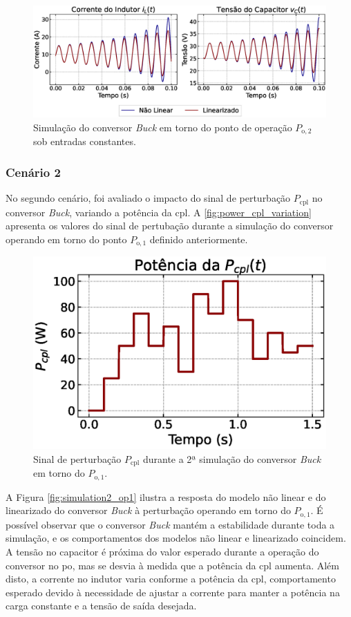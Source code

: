 \begin{figure}[H]
  \centering
  \captionsetup{justification=centering}
  \includegraphics[width=1.\textwidth]{figuras/buck/sim1/op2/result.eps}
  \caption{Simulação do conversor \textit{Buck} em torno do ponto de operação $P_{\mathrm{o}, 2}$ sob entradas constantes.}
  \label{fig:simulation_1_buck_2}
\end{figure}

\subsubsection{Cenário 2}

No segundo cenário, foi avaliado o impacto do sinal de perturbação $P_{\mathrm{cpl}}$ no conversor \textit{Buck}, variando a potência da \acrshort{cpl}. A \autoref{fig:power_cpl_variation} apresenta os valores do sinal de pertubação durante a simulação do conversor operando em torno do ponto $P_{\mathrm{o}, 1}$ definido anteriormente.

\begin{figure}[H]
  \centering
  \includegraphics[width=.5\textwidth]{figuras/buck/sim2/op1/power_cpl_variation.eps}
  \captionsetup{justification=centering}
  \caption{Sinal de perturbação $P_{\mathrm{cpl}}$ durante a 2ª simulação do conversor \textit{Buck} em torno do $P_{\mathrm{o}, 1}$.}
  \label{fig:power_cpl_variation}
\end{figure}

A Figura \ref{fig:simulation2_op1} ilustra a resposta do modelo não linear e do linearizado do conversor \textit{Buck} à perturbação operando em torno do $P_{\mathrm{o}, 1}$.  É possível observar que o conversor \textit{Buck} mantém a estabilidade durante toda a simulação, e os comportamentos dos modelos não linear e linearizado coincidem. A tensão no capacitor é próxima do valor esperado durante a operação do conversor no \acrshort{po}, mas se desvia à medida que a potência da \acrshort{cpl} aumenta. Além disto, a corrente no indutor varia conforme a potência da \acrshort{cpl}, comportamento esperado devido à necessidade de ajustar a corrente para manter a potência na carga constante e a tensão de saída desejada.

